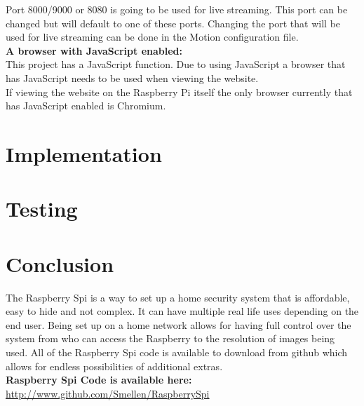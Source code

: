 \documentclass[]{report}
\begin{document}
Port 8000/9000 or 8080 is going to be used for live streaming. This port can be changed but will default to one of these ports. Changing the port that will be used for live streaming can be done in the Motion configuration file.\\


{\bf A browser with JavaScript enabled:}\\

This project has a JavaScript function. Due to using JavaScript a browser that has JavaScript needs to be used when viewing the website.\\

If viewing the website on the Raspberry Pi itself the only browser currently that has JavaScript enabled is Chromium.\\
%
%
\chapter {Implementation}
\label {ch:implem}
\chapter {Testing}
\label {ch:test}
%
%
%
%
%
\chapter {Conclusion}
\label {ch:concl}
%
%
%
%
%
\begin{small}
 The Raspberry Spi is a way to set up a home security system that is affordable, easy to hide and not complex. It can have multiple real life uses depending on the end user. Being set up on a home network allows for having full control over the system from who can access the Raspberry to the resolution of images being used. All of the Raspberry Spi code is available to download from github which allows for endless possibilities of additional extras.\\

{\bf Raspberry Spi Code is available here:\\}
\url {http://www.github.com/Smellen/RaspberrySpi}
\end{small}

\end{document}
